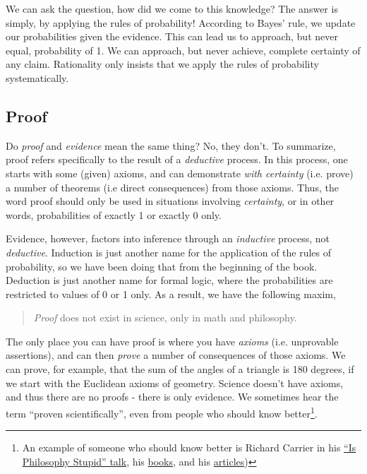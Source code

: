 We can ask the question, how did we come to this knowledge?  The answer is simply, by applying the rules of probability!  According to Bayes' rule, we update our probabilities given the evidence.  This can lead us to approach, but never equal, probability of 1.  We can approach, but never achieve, complete certainty of any claim.  Rationality only insists that we apply the rules of probability systematically. 

\subsection{Proof}

Do {\em proof} and {\em evidence} mean the same thing?  No, they don't. To summarize,
proof refers specifically to the result of a \emph{deductive} process.  In this process, one starts with some (given) axioms, and can demonstrate \emph{with certainty} (i.e. prove) a number of theorems (i.e direct consequences) from those axioms.  Thus, the word proof should only be used in situations involving \emph{certainty}, or in other words, probabilities of exactly 1 or exactly 0 only.

Evidence, however, factors into inference through an \emph{inductive} process, not \emph{deductive}.  Induction is just another name for the application of the rules of probability, so we have been doing that from the beginning of the book.  Deduction is just another name for formal logic, where the probabilities are restricted to values of 0 or 1 only.  As a result, we have the following maxim,


\begin{quote}
\emph{Proof} does not exist in science, only in math and philosophy.
\end{quote}

The only place you can have proof is where you have \emph{axioms}
(i.e. unprovable assertions), and can then \emph{prove} a number of
consequences of those axioms. We can prove, for example, that the sum of
the angles of a triangle is 180 degrees, if we start with the Euclidean
axioms of geometry. Science doesn't have axioms, and thus there are no
proofs - there is only evidence. We sometimes hear the term ``proven
scientifically'', even from people who should know better\footnote{An example of someone who should know better is Richard
Carrier in his \href{http://www.youtube.com/watch?v=YLvWz9GQ3PQ}{``Is
Philosophy Stupid'' talk}, his
\href{http://www.amazon.com/Proving-History-Bayess-Theorem-Historical/dp/1616145595}{books},
and his
\href{http://infidels.org/library/modern/richard_carrier/theory.html}{articles})}.

